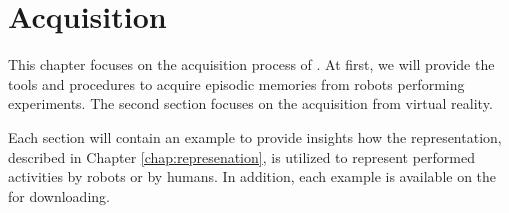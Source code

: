 \chapter{Acquisition}
This chapter focuses on the acquisition process of \neems.
At first, we will provide the tools and procedures to acquire episodic memories from robots performing experiments.
The second section focuses on the \neem acquisition from virtual reality. 

Each section will contain an example \neem to provide insights how the representation, described in Chapter \ref{chap:represenation}, is utilized to represent performed activities by robots or by humans. 
In addition, each example \neem is available on the \neemhub for downloading.


